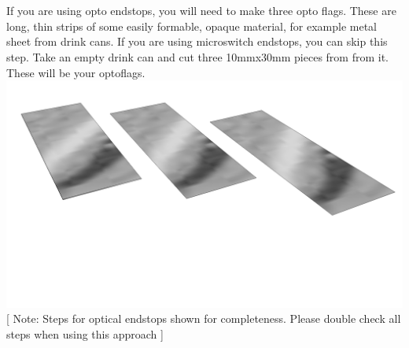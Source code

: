 \documentclass[twoside,openany,a4paper,titlepage]{memoir}
\begin{document}
	\section{}
	If you are using opto endstops, you will need to make three opto flags. These are long, thin strips of
	some easily formable, opaque material, for example metal sheet from drink cans. If you are using
	microswitch endstops, you can skip this step. Take an empty drink can and cut three 10mmx30mm
	pieces from from it. These will be your optoflags.\\
	\includegraphics[width=1\linewidth]{graphics/ch10_3.png}	
	[ Note: Steps for optical endstops shown for completeness. Please double check all steps when using this approach ]
	
\end{document}
